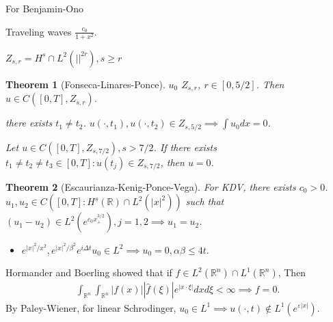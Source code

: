 \documentclass[12pt,reqno]{amsart}
\numberwithin{equation}{section}  %
\newcommand{\rr}{\mathbb{R}}
\newcommand{\wh}{\widehat}
\newcommand{\ee}{\varepsilon}
\newtheorem{theorem}{Theorem}[section]
\begin{document}
\begin{itemize}For Benjamin-Ono
    \item Traveling waves $\frac{c_{0}}{1 + x^{2}}$.
	\item $Z_{s,r} = H^{s} \cap L^{2}(|  |^{2r}), s \ge r$
	\begin{theorem}[Fonseca-Linares-Ponce]
	    \item $u_{0}$ \in $Z_{s,r}$, $r \in [0, 5/2]$. Then $u \in C([0, T], Z_{s,r})$.
		\item{}
		 there exists $t_{1} \neq t_{2}$. $u(\cdot, t_{1}), u(\cdot, t_{2}) \in Z_{s, 5/2} \implies \int u_{0} dx = 0$.
		 \item{}
		 Let $u \in C([0, T], Z_{s, 7/2}), s > 7/2$. If there exists $t_{1} \neq t_2 \neq t_3 \in [0, T] : u(t_{j}) \in Z_{s, 7/2}$, then $u = 0$.
	\label{thm:}
	\end{theorem}

\begin{theorem}[Escaurianza-Kenig-Ponce-Vega]
    \item For KDV, there exists $c_{0} > 0$. $u_{1}, u_{2} \in C([0,T]: H^{s}(\rr) \cap L^{2}(| x |^{2}))$ such that $(u_{1} - u_{2}) \in L^{2}(e^{c_{0} x_{+}^{3/2}}), j=1,2 \implies u_{1} = u_{2}$.

\label{thm:}
\end{theorem}


\end{itemize}


\begin{itemize} For Schrodinger equation, $u_{x,t} = e^{it \Delta} u_{0}$. If $u_{0} \in L^{1}$ with compact support, then $u(\cdot, t) \not \in L^{1}(e^{\ee | x |})$.
    \item $e^{|x |^{2}/ x^{2}}, e^{| x |^{2}/\beta^{2}} e^{i \Delta t} u_{0} \in L^{2}  \implies u_{0} = 0, \alpha \beta \le 4t$.
\end{itemize}

Hormander and Boerling showed that if $f \in L^{2}(\rr^{n}) \cap L^{1}(\rr^{n})$, Then 
\begin{equation*}
\begin{split}
    \int_{\rr^{n}} \int_{\rr^{n}} | f(x) | | \wh{f}(\xi) | e^{| x \cdot \xi |} dx d \xi < \infty \implies f = 0.
\end{split}
\end{equation*}
By Paley-Wiener, for linear Schrodinger, $u_{0} \in L^{1} \implies u(\cdot, t) \not \in L^{1}(e^{\ee | x |})$.
\end{document}
